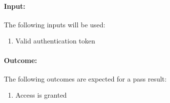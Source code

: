 \documentclass{article}
\begin{document}
\paragraph{Input:} The following inputs will be used:
	\begin{enumerate}
  	\item Valid authentication token
    \end{enumerate}	  

\paragraph{Outcome:} The following outcomes are expected for a pass result:
\begin{enumerate}
	\item Access is granted
\end{enumerate}



\pagebreak
\end{document}

